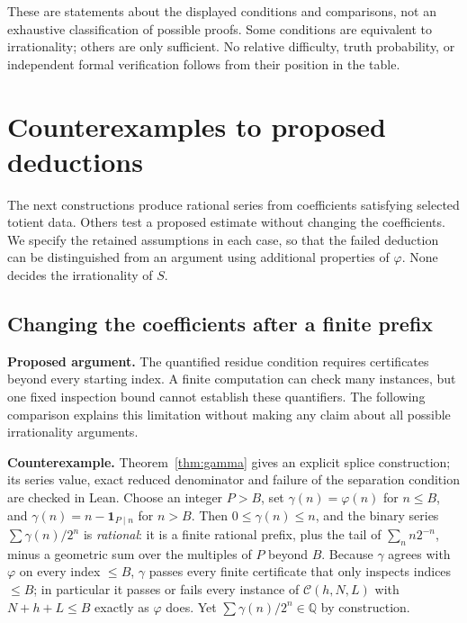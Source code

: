 These are statements about the displayed conditions and comparisons, not
an exhaustive classification of possible proofs. Some conditions are
equivalent to irrationality; others are only sufficient. No relative
difficulty, truth probability, or independent formal verification follows
from their position in the table.

\section{Counterexamples to proposed deductions}

The next constructions produce rational series from coefficients
satisfying selected totient data. Others test a proposed estimate
without changing the coefficients. We specify the retained assumptions
in each case, so that the failed deduction can be distinguished from
an argument using additional properties of $\varphi$. None decides the
irrationality of $S$.


\subsection{Changing the coefficients after a finite prefix}

\textbf{Proposed argument.} The quantified residue condition requires
certificates beyond every starting index. A finite computation can check
many instances, but one fixed inspection bound cannot establish these
quantifiers. The following comparison explains this limitation without
making any claim about all possible irrationality arguments.


\textbf{Counterexample.} Theorem~\ref{thm:gamma} gives an explicit splice
construction; its series value, exact reduced denominator and failure of the
separation condition are checked in Lean. Choose an integer \(P>B\), set
\(\gamma(n)=\varphi(n)\) for \(n\le B\), and \(\gamma(n)=n-\mathbf 1_{P\mid n}\)
for \(n>B\). Then \(0\le\gamma(n)\le n\), and the binary series
\(\sum\gamma(n)/2^n\) is \emph{rational}: it is a finite rational prefix, plus
the tail of \(\sum_n n2^{-n}\), minus a geometric sum over the multiples of
\(P\) beyond \(B\). Because \(\gamma\) agrees with \(\varphi\) on every index
\(\le B\), \(\gamma\) passes every finite certificate that only inspects
indices \(\le B\); in particular it passes or fails every instance of
\(\mathcal{C}(h,N,L)\) with \(N+h+L\le B\) exactly as \(\varphi\) does. Yet
\(\sum\gamma(n)/2^n\in\mathbb Q\) by construction.

